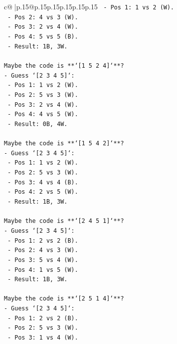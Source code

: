 \documentclass{article}
\begin{document}
{\begin{supertabular}{c@{$\;$}|p{.15\linewidth}@{}p{.15\linewidth}p{.15\linewidth}p{.15\linewidth}p{.15\linewidth}p{.15\linewidth}}
{{{\texttt{    {-} Pos 1: 1 vs 2 (W).} \\
\texttt{    {-} Pos 2: 4 vs 3 (W).} \\
\texttt{    {-} Pos 3: 2 vs 4 (W).} \\
\texttt{    {-} Pos 4: 5 vs 5 (B).} \\
\texttt{    {-} Result: 1B, 3W.} \\
\\ 
\texttt{Maybe the code is **`{[}1 5 2 4{]}`**?} \\
\texttt{{-} Guess `{[}2 3 4 5{]}`:} \\
\texttt{    {-} Pos 1: 1 vs 2 (W).} \\
\texttt{    {-} Pos 2: 5 vs 3 (W).} \\
\texttt{    {-} Pos 3: 2 vs 4 (W).} \\
\texttt{    {-} Pos 4: 4 vs 5 (W).} \\
\texttt{    {-} Result: 0B, 4W.} \\
\\ 
\texttt{Maybe the code is **`{[}1 5 4 2{]}`**?} \\
\texttt{{-} Guess `{[}2 3 4 5{]}`:} \\
\texttt{    {-} Pos 1: 1 vs 2 (W).} \\
\texttt{    {-} Pos 2: 5 vs 3 (W).} \\
\texttt{    {-} Pos 3: 4 vs 4 (B).} \\
\texttt{    {-} Pos 4: 2 vs 5 (W).} \\
\texttt{    {-} Result: 1B, 3W.} \\
\\ 
\texttt{Maybe the code is **`{[}2 4 5 1{]}`**?} \\
\texttt{{-} Guess `{[}2 3 4 5{]}`:} \\
\texttt{    {-} Pos 1: 2 vs 2 (B).} \\
\texttt{    {-} Pos 2: 4 vs 3 (W).} \\
\texttt{    {-} Pos 3: 5 vs 4 (W).} \\
\texttt{    {-} Pos 4: 1 vs 5 (W).} \\
\texttt{    {-} Result: 1B, 3W.} \\
\\ 
\texttt{Maybe the code is **`{[}2 5 1 4{]}`**?} \\
\texttt{{-} Guess `{[}2 3 4 5{]}`:} \\
\texttt{    {-} Pos 1: 2 vs 2 (B).} \\
\texttt{    {-} Pos 2: 5 vs 3 (W).} \\
\texttt{    {-} Pos 3: 1 vs 4 (W).} \\
}}}
\end{supertabular}}
\end{document}
